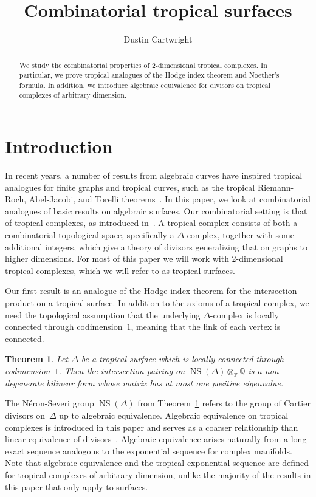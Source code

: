 \documentclass[11pt]{amsart}
\title{Combinatorial tropical surfaces}
\author{Dustin Cartwright}
\newtheorem{thm}{Theorem}[section]
\theoremstyle{definition}
\newcommand{\NS}{\operatorname{NS}}
\newcommand{\QQ}{\mathbb Q}
\newcommand{\ZZ}{\mathbb Z}
\begin{document}
\begin{abstract}
We study the combinatorial properties of $2$-dimensional tropical complexes. In
particular, we prove tropical analogues of the Hodge index theorem
and Noether's formula. In addition, we introduce algebraic
equivalence for divisors on tropical complexes of arbitrary dimension.
\end{abstract}

\maketitle

\section{Introduction}

In recent years, a number of results from algebraic curves have inspired
tropical analogues for finite graphs and tropical curves, such as the tropical
Riemann-Roch, Abel-Jacobi, and Torelli
theorems~\cite{baker-norine,mikhalkin-zharkov,brannetti-melo-viviani}. In this
paper, we look at combinatorial analogues of basic results on algebraic
surfaces. Our combinatorial setting is that of tropical complexes, as introduced
in~\cite{cartwright-complexes}. A tropical complex consists of both a
combinatorial topological space, specifically a $\Delta$-complex, together with
some additional integers, which give a theory of divisors generalizing that on
graphs to higher dimensions. For most of this paper we will work with
2-dimensional tropical complexes, which we will refer to as tropical surfaces.

Our first result is an analogue of the Hodge index theorem for the intersection
product on a tropical surface.
In addition to the axioms of a tropical complex, we need the
topological assumption that the underlying $\Delta$-complex is locally connected through
codimension~$1$, meaning that the link of each vertex is connected.

\begin{thm}\label{thm:hodge}
Let $\Delta$ be a tropical surface which is
locally connected through codimension~$1$. Then the intersection pairing on
$\NS(\Delta) \otimes_\ZZ \QQ$ is a non-degenerate bilinear form
whose matrix has at most one positive eigenvalue.
\end{thm}

The N\'eron-Severi group $\NS(\Delta)$ from Theorem~\ref{thm:hodge} refers to
the group of Cartier divisors on~$\Delta$ up to algebraic equivalence. Algebraic
equivalence on tropical complexes is introduced in this paper and
serves as a coarser relationship than linear equivalence of
divisors~\cite[Sec.~4]{cartwright-complexes}. Algebraic equivalence arises
naturally from a long exact sequence analogous to the exponential sequence for
complex manifolds. Note that algebraic equivalence and the tropical exponential
sequence are defined for tropical complexes of arbitrary dimension, unlike the
majority of the results in this paper that only apply to surfaces.
\end{document}
